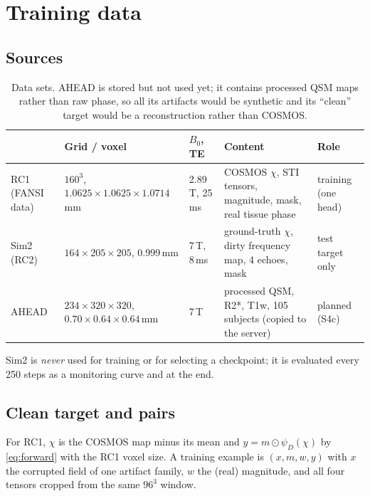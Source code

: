 \documentclass[11pt]{article}
\theoremstyle{remark}
\begin{document}
\section{Training data}\label{sec:data}

\subsection{Sources}
\begin{table}[h]
\centering\small
\begin{tabularx}{\linewidth}{@{}p{2.0cm}p{3.3cm}p{1.7cm}Xp{1.9cm}@{}}
\toprule
 & Grid / voxel & $B_0$, TE & Content & Role \\
\midrule
RC1 (FANSI data) & $160^3$, $1.0625\times1.0625\times1.0714$\,mm & 2.89\,T, 25\,ms & COSMOS $\chi$, STI tensors, magnitude, mask, real tissue phase & training (one head) \\
Sim2 (RC2) & $164\times205\times205$, 0.999\,mm & 7\,T, 8\,ms & ground-truth $\chi$, dirty frequency map, 4 echoes, mask & test target only \\
AHEAD \cite{ahead} & $234\times320\times320$, $0.70\times0.64\times0.64$\,mm & 7\,T & processed QSM, R2*, T1w, 105 subjects (copied to the server) & planned (S4c) \\
\bottomrule
\end{tabularx}
\caption{Data sets. AHEAD is stored but not used yet; it contains processed QSM maps rather than raw phase, so all its artifacts would be synthetic and its ``clean'' target would be a reconstruction rather than COSMOS.}
\end{table}
Sim2 is \emph{never} used for training or for selecting a checkpoint; it is evaluated every 250 steps as a monitoring curve and at the end.

\subsection{Clean target and pairs}
For RC1, $\chi$ is the COSMOS map minus its mean and $y=m\odot\psi_D(\chi)$ by \eqref{eq:forward} with the RC1 voxel size. A training example is $(x,m,w,y)$ with $x$ the corrupted field of one artifact family, $w$ the (real) magnitude, and all four tensors cropped from the same $96^3$ window.
\end{document}
